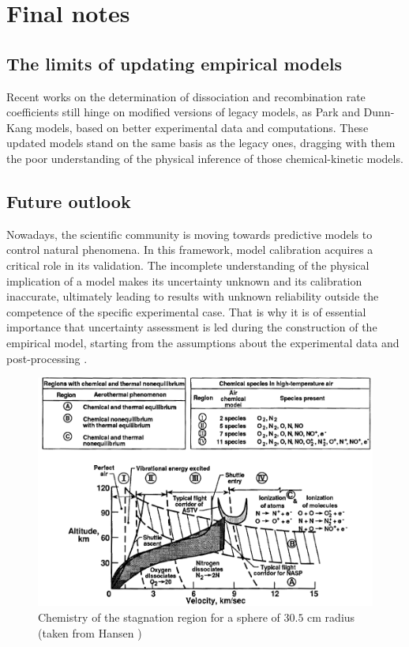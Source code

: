 \documentclass[11pt,a4paper,twocolumn]{article}
\begin{document}
\section{Final notes}
\subsection{The limits of updating empirical models}
Recent works on the determination of dissociation and recombination rate coefficients \cite{kim2021modification}\cite{helber2017determination}\cite{panerai2012characterization} still hinge on modified versions of legacy models, as Park and Dunn-Kang models, based on better experimental data and computations. These updated models stand on the same basis as the legacy ones, dragging with them the poor understanding of the physical inference of those chemical-kinetic models.
\subsection{Future outlook}
Nowadays, the scientific community is moving towards predictive models to control natural phenomena. In this framework, model calibration acquires a critical role in its validation. The incomplete understanding of the physical implication of a model makes its uncertainty unknown and its calibration inaccurate, ultimately leading to results with unknown reliability outside the competence of the specific experimental case. That is why it is of essential importance that uncertainty assessment is led during the construction of the empirical model, starting from the assumptions about the experimental data and post-processing \cite{del2021bayesian}\cite{del2023stochastic}.

\onecolumn
\appendix
\begin{figure}[]
    \centering
    \includegraphics[width=1\textwidth]{myimages/regimes.png}
    \caption{Chemistry of the stagnation region for a sphere of $30.5$ cm radius (taken from Hansen \cite{hansen1958review})}
    \label{fig:nonequilibrium}
\end{figure}
\end{document}
